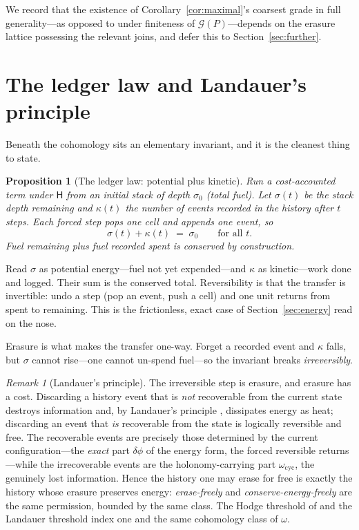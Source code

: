 \documentclass[11pt]{article}
\theoremstyle{definition}
\theoremstyle{plain}
\newtheorem{proposition}[definition]{Proposition}
\theoremstyle{remark}
\newtheorem{remark}[definition]{Remark}
\newcommand{\hist}{\mathsf{H}}
\newcommand{\Grph}{\mathcal{G}}
\begin{document}
We record that the existence of Corollary~\ref{cor:maximal}'s coarsest grade in full generality---as
opposed to under finiteness of $\Grph(P)$---depends on the erasure lattice possessing the relevant
joins, and defer this to Section~\ref{sec:further}.

\section{The ledger law and Landauer's principle}
\label{sec:ledger}

Beneath the cohomology sits an elementary invariant, and it is the cleanest thing to state.

\begin{proposition}[The ledger law: potential plus kinetic]\label{prop:ledger}
Run a cost-accounted term under $\hist$ from an initial stack of depth $\sigma_0$ (total fuel). Let
$\sigma(t)$ be the stack depth remaining and $\kappa(t)$ the number of events recorded in the
history after $t$ steps. Each forced step pops one cell and appends one event, so
\[
  \sigma(t)+\kappa(t)\;=\;\sigma_0\qquad\text{for all }t.
\]
Fuel remaining plus fuel recorded spent is conserved by construction.
\end{proposition}

Read $\sigma$ as potential energy---fuel not yet expended---and $\kappa$ as kinetic---work done and
logged. Their sum is the conserved total. Reversibility is that the transfer is invertible: undo a
step (pop an event, push a cell) and one unit returns from spent to remaining. This is the
frictionless, exact case of Section~\ref{sec:energy} read on the nose.

Erasure is what makes the transfer one-way. Forget a recorded event and $\kappa$ falls, but $\sigma$
cannot rise---one cannot un-spend fuel---so the invariant breaks \emph{irreversibly}.

\begin{remark}[Landauer's principle]\label{rmk:landauer}
The irreversible step is erasure, and erasure has a cost. Discarding a history event that is
\emph{not} recoverable from the current state destroys information and, by Landauer's principle
\cite{Landauer,Bennett}, dissipates energy as heat; discarding an event that \emph{is} recoverable
from the state is logically reversible and free. The recoverable events are precisely those
determined by the current configuration---the \emph{exact} part $\delta\phi$ of the energy form,
the forced reversible returns---while the irrecoverable events are the holonomy-carrying part
$\omega_{\mathrm{cyc}}$, the genuinely lost information. Hence the history one may erase for free is
exactly the history whose erasure preserves energy: \emph{erase-freely} and
\emph{conserve-energy-freely} are the same permission, bounded by the same class. The Hodge
threshold of \cite{VT} and the Landauer threshold index one and the same cohomology class of
$\omega$.
\end{remark}
\end{document}
